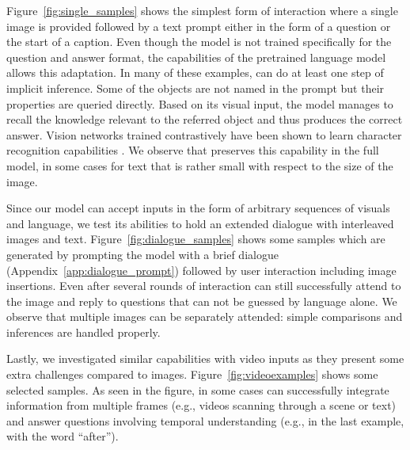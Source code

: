 Figure~\ref{fig:single_samples} shows the simplest form of interaction where a single image is provided followed by a text prompt either in the form of a question or the start of a caption. 
Even though the model is not trained specifically for the question and answer format, the capabilities of the pretrained language model allows this adaptation. 
In many of these examples, \largem{} can do at least one step of implicit inference. Some of the objects are not named in the prompt but their properties are queried directly. Based on its visual input, the model manages to recall the knowledge relevant to the referred object and thus produces the correct answer.
Vision networks trained contrastively have been shown to learn character recognition capabilities \cite{clip}. We observe that \largem{} preserves this capability in the full model, in some cases for text that is rather small with respect to the size of the image.

Since our model can accept inputs in the form of arbitrary sequences of visuals and language, we test its abilities to hold an extended dialogue with interleaved images and text. Figure~\ref{fig:dialogue_samples} shows some samples which are generated by prompting the model with a brief dialogue (Appendix~\ref{app:dialogue_prompt}) followed by user interaction including image insertions. Even after several rounds of interaction \largem{} can still successfully attend to the image and reply to questions that can not be guessed by language alone. We observe that multiple images can be separately attended: simple comparisons and inferences are handled properly.

Lastly, we investigated similar capabilities with video inputs as they present some extra challenges compared to images. Figure~\ref{fig:videoexamples} shows some selected samples. As seen in the figure, in some cases \largem{} can successfully integrate information from multiple frames (e.g., videos scanning through a scene or text) and answer questions involving temporal understanding (e.g., in the last example, with the word ``after'').



